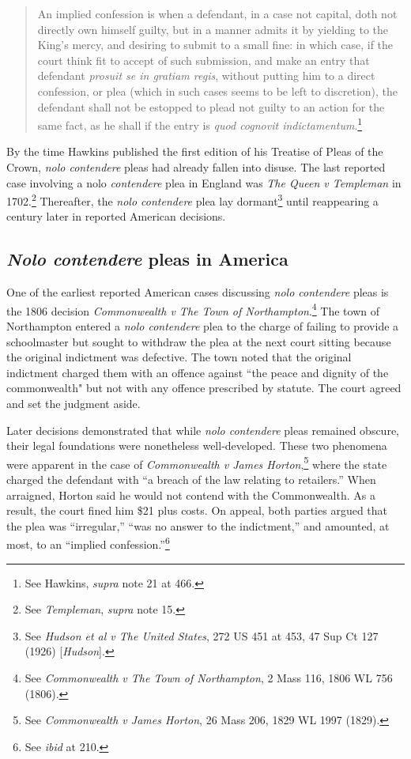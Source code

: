 \begin{quote}
\singlespacing
An implied confession is when a defendant, in a case not capital, doth not directly own himself guilty, but in a manner admits it by yielding to the King's mercy, and desiring to submit to a small fine: in which case, if the court think fit to accept of such submission, and make an entry that defendant \textit{prosuit se in gratiam regis}, without putting him to a direct confession, or plea (which in such cases seems to be left to discretion), the defendant shall not be estopped to plead not guilty to an action for the same fact, as he shall if the entry is \textit{quod cognovit indictamentum}.\footnote{See Hawkins, \textit{supra} note 21 at 466.}
\end{quote}
By the time Hawkins published the first edition of his Treatise of Pleas of the Crown, \textit{nolo contendere} pleas had already fallen into disuse. The last reported case involving a nolo\textit{ contendere} plea in England was \textit{The Queen v Templeman} in 1702.\footnote{See \textit{Templeman}, \textit{supra} note 15.} Thereafter, the \textit{nolo contendere} plea lay dormant\footnote{See \textit{Hudson et al v The United States}, 272 US 451 at 453, 47 Sup Ct 127 (1926) [\textit{Hudson}].} until reappearing a century later in reported American decisions.

\subsection{\textit{Nolo contendere} pleas in America}

One of the earliest reported American cases discussing \textit{nolo contendere} pleas is the 1806 decision \textit{Commonwealth v The Town of Northampton}.\footnote{See \textit{Commonwealth v The Town of Northampton}, 2 Mass 116, 1806 WL 756 (1806).} The town of Northampton entered a \textit{nolo contendere} plea to the charge of failing to provide a schoolmaster but sought to withdraw the plea at the next court sitting because the original indictment was defective. The town noted that the original indictment charged them with an offence against ``the peace and dignity of the commonwealth" but not with any offence prescribed by statute. The court agreed and set the judgment aside.

Later decisions demonstrated that while \textit{nolo contendere} pleas remained obscure, their legal foundations were nonetheless well-developed. These two phenomena were apparent in the case of \textit{Commonwealth v James Horton},\footnote{See \textit{Commonwealth v James Horton}, 26 Mass 206, 1829 WL 1997 (1829).} where the state charged the defendant with ``a breach of the law relating to retailers.'' When arraigned, Horton said he would not contend with the Commonwealth. As a result, the court fined him \$21 plus costs. On appeal, both parties argued that the plea was ``irregular,'' ``was no answer to the indictment,'' and amounted, at most, to an ``implied confession.''\footnote{See \textit{ibid} at 210.} 

